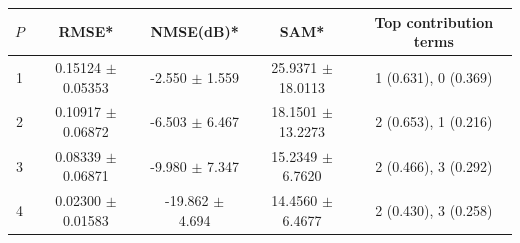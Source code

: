 \begin{tabular}{c c c c c}
\toprule
$P$ & RMSE* & NMSE(dB)* & SAM* & Top contribution terms \\
\midrule
    1 & 0.15124 $\pm$ 0.05353 & -2.550 $\pm$ 1.559 & 25.9371 $\pm$ 18.0113 & 1 (0.631), 0 (0.369) \\
    2 & 0.10917 $\pm$ 0.06872 & -6.503 $\pm$ 6.467 & 18.1501 $\pm$ 13.2273 & 2 (0.653), 1 (0.216) \\
    3 & 0.08339 $\pm$ 0.06871 & -9.980 $\pm$ 7.347 & 15.2349 $\pm$ 6.7620 & 2 (0.466), 3 (0.292) \\
    4 & 0.02300 $\pm$ 0.01583 & -19.862 $\pm$ 4.694 & 14.4560 $\pm$ 6.4677 & 2 (0.430), 3 (0.258) \\
\bottomrule
\end{tabular}
